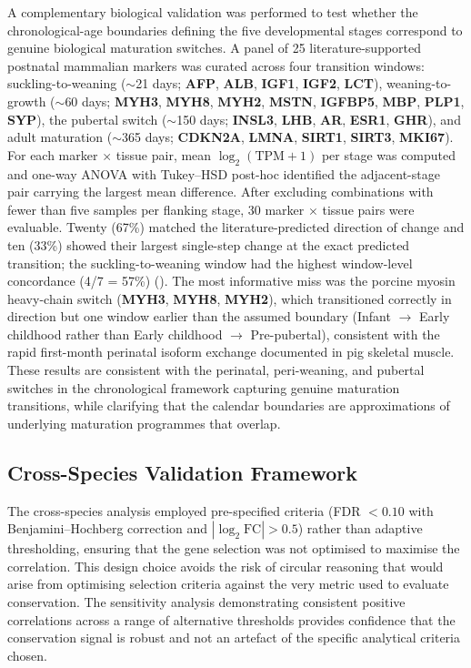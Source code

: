 A complementary biological validation was performed to test whether the chronological-age boundaries defining the five developmental stages correspond to genuine biological maturation switches. A panel of 25 literature-supported postnatal mammalian markers was curated across four transition windows: suckling-to-weaning ($\sim$21 days; \textbf{AFP}, \textbf{ALB}, \textbf{IGF1}, \textbf{IGF2}, \textbf{LCT}), weaning-to-growth ($\sim$60 days; \textbf{MYH3}, \textbf{MYH8}, \textbf{MYH2}, \textbf{MSTN}, \textbf{IGFBP5}, \textbf{MBP}, \textbf{PLP1}, \textbf{SYP}), the pubertal switch ($\sim$150 days; \textbf{INSL3}, \textbf{LHB}, \textbf{AR}, \textbf{ESR1}, \textbf{GHR}), and adult maturation ($\sim$365 days; \textbf{CDKN2A}, \textbf{LMNA}, \textbf{SIRT1}, \textbf{SIRT3}, \textbf{MKI67}). For each marker $\times$ tissue pair, mean $\log_2(\text{TPM}+1)$ per stage was computed and one-way ANOVA with Tukey--HSD post-hoc identified the adjacent-stage pair carrying the largest mean difference. After excluding combinations with fewer than five samples per flanking stage, 30 marker $\times$ tissue pairs were evaluable. Twenty (67\%) matched the literature-predicted direction of change and ten (33\%) showed their largest single-step change at the exact predicted transition; the suckling-to-weaning window had the highest window-level concordance (4/7 = 57\%) (). The most informative miss was the porcine myosin heavy-chain switch (\textbf{MYH3}, \textbf{MYH8}, \textbf{MYH2}), which transitioned correctly in direction but one window earlier than the assumed boundary (Infant $\rightarrow$ Early childhood rather than Early childhood $\rightarrow$ Pre-pubertal), consistent with the rapid first-month perinatal isoform exchange documented in pig skeletal muscle. These results are consistent with the perinatal, peri-weaning, and pubertal switches in the chronological framework capturing genuine maturation transitions, while clarifying that the calendar boundaries are approximations of underlying maturation programmes that overlap.

\subsection{Cross-Species Validation Framework}

The cross-species analysis employed pre-specified criteria (FDR $< 0.10$ with Benjamini--Hochberg correction and $|\log_2\text{FC}| > 0.5$) rather than adaptive thresholding, ensuring that the gene selection was not optimised to maximise the correlation. This design choice avoids the risk of circular reasoning that would arise from optimising selection criteria against the very metric used to evaluate conservation. The sensitivity analysis demonstrating consistent positive correlations across a range of alternative thresholds provides confidence that the conservation signal is robust and not an artefact of the specific analytical criteria chosen.

